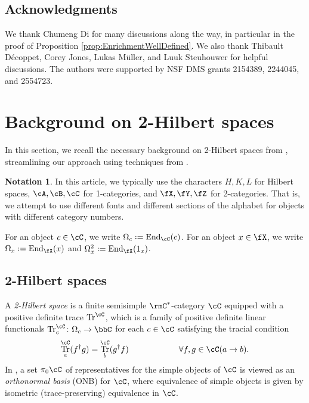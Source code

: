 \documentclass[12pt, reqno]{amsart}
\DeclareMathOperator{\End}{End}
\DeclareMathOperator{\Tr}{Tr}
\theoremstyle{plain}
\theoremstyle{definition}
\newtheorem{nota}[thm]{Notation}
\newcommand{\coloneq}{:=}
\def\coloneq{\mathrel{\vcenter{\baselineskip0.55ex\lineskiplimit0pt\hbox{\upshape.}\hbox{\upshape.}}}=}
\begin{document}
\subsection*{Acknowledgments}
We thank Chumeng Di for many discussions along the way, in particular in the proof of Proposition \ref{prop:EnrichmentWellDefined}.
We also thank
Thibault D\'ecoppet, 
Corey Jones,
Lukas M\"uller, and Luuk Steuhouwer
for helpful discussions. 
The authors were supported by NSF DMS grants 2154389, 2244045, and 2554723.

\section{Background on 2-Hilbert spaces}
\label{sec:backgroundon2Hilbs}
In this section, we recall the necessary background on  2-Hilbert spaces from \cite{MR1448713}, streamlining our approach 
using techniques from \cite{2411.01678}.

\begin{nota}
In this article, we typically use the characters $H,K,L$ for Hilbert spaces, $\cA,\cB,\cC$ for 1-categories, and $\fX,\fY,\fZ$ for 2-categories.
That is, we attempt to use different fonts and different sections of the alphabet for objects with different category numbers.

For an object $c\in\cC$, we write $\Omega_c\coloneq\End_\cC(c)$.
For an object $x\in\fX$, we write $\Omega_x\coloneq\End_\fX(x)$ and $\Omega^2_x\coloneq\End_\fX(1_x)$.
\end{nota}

\subsection{2-Hilbert spaces}\label{subsec:2Hilbs}

A \emph{2-Hilbert space} is a finite semisimple $\rmC^*$-category $\cC$ equipped with a positive definite trace $\Tr^\cC$, which is a family of positive definite linear functionals $\Tr^\cC_c\colon  \Omega_c\to \bbC$ for each $c\in \cC$ satisfying the tracial condition
$$
\Tr^\cC_a(f^\dag g) = \Tr^\cC_b(g^\dag f)
\qquad\qquad\qquad
\forall f,g\in\cC(a\to b).
$$
In \cite{MR1448713}, a set $\pi_0\cC$ of representatives for the simple objects of $\cC$ is viewed as an \emph{orthonormal basis} (ONB) for $\cC$, where equivalence of simple objects is given by isometric (trace-preserving) equivalence in $\cC$.
\end{document}
